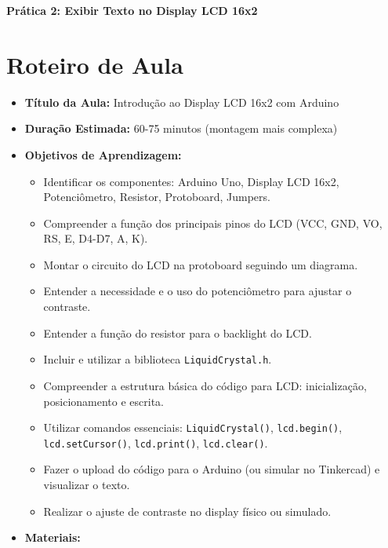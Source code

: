 \documentclass[a4paper,12pt]{article}
\begin{document}
\begin{center}
    \textbf{\Large Prática 2: Exibir Texto no Display LCD 16x2}
\end{center}

\vspace{1cm}

\section*{Roteiro de Aula}

\begin{itemize}
    \item \textbf{Título da Aula:} Introdução ao Display LCD 16x2 com Arduino
    \item \textbf{Duração Estimada:} 60-75 minutos (montagem mais complexa)
    \item \textbf{Objetivos de Aprendizagem:}
    \begin{itemize}
        \item Identificar os componentes: Arduino Uno, Display LCD 16x2, Potenciômetro, Resistor, Protoboard, Jumpers.
        \item Compreender a função dos principais pinos do LCD (VCC, GND, VO, RS, E, D4-D7, A, K).
        \item Montar o circuito do LCD na protoboard seguindo um diagrama.
        \item Entender a necessidade e o uso do potenciômetro para ajustar o contraste.
        \item Entender a função do resistor para o backlight do LCD.
        \item Incluir e utilizar a biblioteca \texttt{LiquidCrystal.h}.
        \item Compreender a estrutura básica do código para LCD: inicialização, posicionamento e escrita.
        \item Utilizar comandos essenciais: \texttt{LiquidCrystal()}, \texttt{lcd.begin()}, \texttt{lcd.setCursor()}, \texttt{lcd.print()}, \texttt{lcd.clear()}.
        \item Fazer o upload do código para o Arduino (ou simular no Tinkercad) e visualizar o texto.
        \item Realizar o ajuste de contraste no display físico ou simulado.
    \end{itemize}
    \item \textbf{Materiais:}

\end{itemize}
\end{document}
